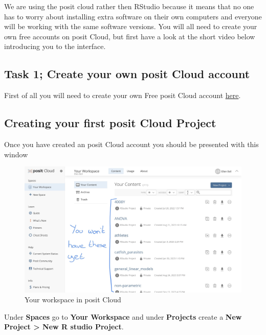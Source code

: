 \documentclass[
]{book}
\begin{document}
We are using the posit cloud rather then RStudio because it means that no one has to worry about installing extra software on their own computers and everyone will be working with the same software versions. You will all need to create your own free accounts on posit Cloud, but first have a look at the short video below introducing you to the interface.

\subsection{Task 1; Create your own posit Cloud account}\label{task-1-create-your-own-posit-cloud-account}

First of all you will need to create your own Free posit Cloud account \href{https://login.rstudio.cloud/login?redirect=\%2Foauth\%2Fauthorize\%3Fredirect_uri\%3Dhttps\%253A\%252F\%252Frstudio.cloud\%252Flogin\%26client_id\%3Drstudio-cloud\%26response_type\%3Dcode\%26show_auth\%3D0\%26show_login\%3D1}{here}.

\subsection{Creating your first posit Cloud Project}\label{creating-your-first-posit-cloud-project}

Once you have created an posit Cloud account you should be presented with this window

\begin{figure}
\includegraphics[width=0.9\linewidth]{figures/posit1} \caption{Your workspace in posit Cloud}\label{fig:unnamed-chunk-1}
\end{figure}

Under \textbf{Spaces} go to \textbf{Your Workspace} and under \textbf{Projects} create a \textbf{New Project \textgreater{} New R studio Project}.
\end{document}

